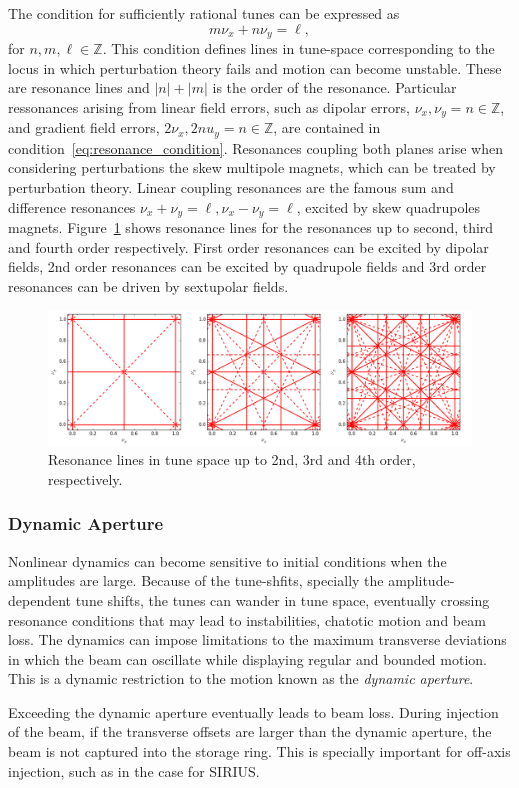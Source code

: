 The condition for sufficiently rational tunes can be expressed as
\begin{equation}
        m\nu_x + n\nu_y = \ell,
        \label{eq:resonance_condition}
\end{equation}
    for $n, m, \ell\in\mathbb{Z}$. This condition defines lines in tune-space corresponding to the locus in which perturbation theory fails and motion can become unstable. These are resonance lines and $|n|+|m|$ is the order of the resonance. Particular ressonances arising from linear field errors, such as dipolar errors, $\nu_x, \nu_y = n\in\mathbb{Z}$, and gradient field errors, $2\nu_x, 2nu_y = n\in\mathbb{Z}$, are contained in condition~\eqref{eq:resonance_condition}. Resonances coupling both planes arise when considering perturbations the skew multipole magnets, which can be treated by perturbation theory. Linear coupling resonances are the famous sum and difference resonances $\nu_x + \nu_y = \ell, \nu_x - \nu_y = \ell$, excited by skew quadrupoles magnets.
    Figure~\ref{resons} shows resonance lines for the resonances up to second, third and fourth order respectively. First order resonances can be excited by dipolar fields, 2nd order resonances can be excited by quadrupole fields and 3rd order resonances can be driven by sextupolar fields.
\begin{figure}[thb]
    \centering
    \includegraphics[width=\textwidth]{Images/tunes.png}
    \caption{Resonance lines in tune space up to 2nd, 3rd and 4th order, respectively.}
    \label{resons}
\end{figure}
\subsubsection{Dynamic Aperture}
    Nonlinear dynamics can become sensitive to initial conditions when the amplitudes are large. Because of the tune-shfits, specially the amplitude-dependent tune shifts, the tunes can wander in tune space, eventually crossing resonance conditions that may lead to instabilities, chatotic motion and beam loss. The dynamics can impose limitations to the maximum transverse deviations in which the beam can oscillate while displaying regular and bounded motion. This is a dynamic restriction to the motion known as the \textit{dynamic aperture}.

    Exceeding the dynamic aperture eventually leads to beam loss. During injection of the beam, if the transverse offsets are larger than the dynamic aperture, the beam is not captured into the storage ring. This is specially important for off-axis injection, such as in the case for SIRIUS.

